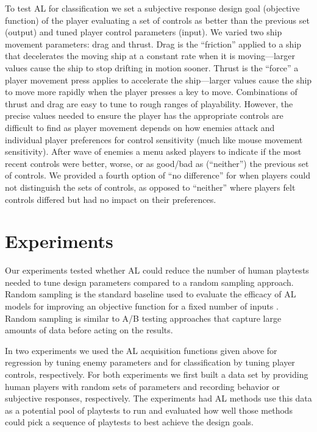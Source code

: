 \documentclass{sig-alternate}
\begin{document}
To test AL for classification we set a subjective response design goal (objective function) of the player evaluating a set of controls as better than the previous set (output) and tuned player control parameters (input).
We varied two ship movement parameters: drag and thrust. 
Drag is the ``friction'' applied to a ship that decelerates the moving ship at a constant rate when it is moving---larger values cause the ship to stop drifting in motion sooner. 
Thrust is the ``force'' a player movement press applies to accelerate the ship---larger values cause the ship to move more rapidly when the player presses a key to move. 
%
Combinations of thrust and drag are easy to tune to rough ranges of playability.
However, the precise values needed to ensure the player has the appropriate controls are difficult to find as player movement depends on how enemies attack and individual player preferences for control sensitivity (much like mouse movement sensitivity).
After wave of enemies a menu asked players to indicate if the most recent controls were better, worse, or as good/bad as (``neither'') the previous set of controls.
We provided a fourth option of ``no difference'' for when players could not distinguish the sets of controls, as opposed to ``neither'' where players felt controls differed but had no impact on their preferences.





\section{Experiments}
Our experiments tested whether AL could reduce the number of human playtests needed to tune design parameters compared to a random sampling approach.
Random sampling is the standard baseline used to evaluate the efficacy of AL models for improving an objective function for a fixed number of inputs \cite{settles2012:al-book}. 
Random sampling is similar to A/B testing approaches that capture large amounts of data before acting on the results.

In two experiments we used the AL acquisition functions given above for regression by tuning enemy parameters and for classification by tuning player controls, respectively.
For both experiments we first built a data set by providing human players with random sets of parameters and recording behavior or subjective responses, respectively.
The experiments had AL methods use this data as a potential pool of playtests to run and evaluated how well those methods could pick a sequence of playtests to best achieve the design goals.
\end{document}

